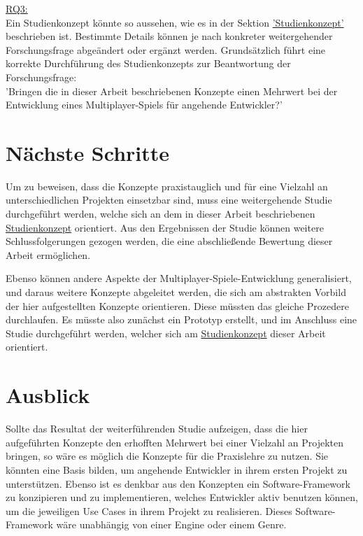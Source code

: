 \hyperref[RQ3]{RQ3:} \\
Ein Studienkonzept könnte so aussehen, wie es in der Sektion \hyperref[studienkonzept]{'Studienkonzept'} beschrieben ist. Bestimmte Details können je nach konkreter weitergehender Forschungsfrage abgeändert oder ergänzt werden. Grundsätzlich führt eine korrekte Durchführung des Studienkonzepts zur Beantwortung der Forschungsfrage: \\
'Bringen die in dieser Arbeit beschriebenen Konzepte einen Mehrwert bei der Entwicklung eines Multiplayer-Spiels für angehende Entwickler?'

\section{Nächste Schritte}

Um zu beweisen, dass die Konzepte praxistauglich und für eine Vielzahl an unterschiedlichen Projekten einsetzbar sind, muss eine weitergehende Studie durchgeführt werden, welche sich an dem in dieser Arbeit beschriebenen \hyperref[studienkonzept]{Studienkonzept} orientiert. Aus den Ergebnissen der Studie können weitere Schlussfolgerungen gezogen werden, die eine abschließende Bewertung dieser Arbeit ermöglichen. 

Ebenso können andere Aspekte der Multiplayer-Spiele-Entwicklung generalisiert, und daraus weitere Konzepte abgeleitet werden, die sich am abstrakten Vorbild der hier aufgestellten Konzepte orientieren. Diese müssten das gleiche Prozedere durchlaufen. Es müsste also zunächst ein Prototyp erstellt, und im Anschluss eine Studie durchgeführt werden, welcher sich am \hyperref[studienkonzept]{Studienkonzept} dieser Arbeit orientiert.

\section{Ausblick}

Sollte das Resultat der weiterführenden Studie aufzeigen, dass die hier aufgeführten Konzepte den erhofften Mehrwert bei einer Vielzahl an Projekten bringen, so wäre es möglich die Konzepte für die Praxislehre zu nutzen. Sie könnten eine Basis bilden, um angehende Entwickler in ihrem ersten Projekt zu unterstützen. Ebenso ist es denkbar aus den Konzepten ein Software-Framework zu konzipieren und zu implementieren, welches Entwickler aktiv benutzen können, um die jeweiligen Use Cases in ihrem Projekt zu realisieren. Dieses Software-Framework wäre unabhängig von einer Engine oder einem Genre.